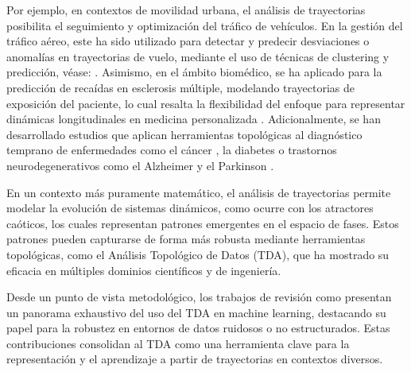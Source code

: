 Por ejemplo, en contextos de movilidad urbana, el análisis de trayectorias posibilita el seguimiento y optimización del tráfico de vehículos. En la gestión del tráfico aéreo, este ha sido utilizado para detectar y predecir desviaciones o anomalías en trayectorias de vuelo, mediante el uso de técnicas de clustering y predicción, véase: \cite{airtraffic2025}. Asimismo, en el ámbito biomédico, se ha aplicado para la predicción de recaídas en esclerosis múltiple, modelando trayectorias de exposición del paciente, lo cual resalta la flexibilidad del enfoque para representar dinámicas longitudinales en medicina personalizada \cite{bosoni2024predicting}. Adicionalmente, se han desarrollado estudios que aplican herramientas topológicas al diagnóstico temprano de enfermedades como el cáncer \cite{jiang2022tdaOnco} \cite{balasubramanian2015cancerTDA}, la diabetes \cite{saleh2023tdaDiabetes} \cite{chi2021diabetes} o trastornos neurodegenerativos como el Alzheimer y el Parkinson \cite{liu2023tdaDementia} \cite{hofer2020tdaParkinson} \cite{jeong2016tdaParkinson} \cite{cheng2024neurodegenerative}.

\vspace{0.1cm}

En un contexto más puramente matemático, el análisis de trayectorias permite modelar la evolución de sistemas dinámicos, como ocurre con los atractores caóticos, los cuales representan patrones emergentes en el espacio de fases. Estos patrones pueden capturarse de forma más robusta mediante herramientas topológicas, como el Análisis Topológico de Datos (TDA), que ha mostrado su eficacia en múltiples dominios científicos y de ingeniería.
\vspace{0.2cm}

Desde un punto de vista metodológico, los trabajos de revisión como \cite{leykam2023topological} \cite{hensel2021survey} presentan un panorama exhaustivo del uso del TDA en machine learning, destacando su papel para la robustez en entornos de datos ruidosos o no estructurados. Estas contribuciones consolidan al TDA como una herramienta clave para la representación y el aprendizaje a partir de trayectorias en contextos diversos.

